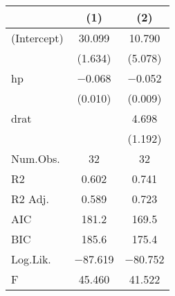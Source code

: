 \begin{table}
\centering
\begin{tabular}[t]{lcc}
\toprule
  & (1) & (2)\\
\midrule
(Intercept) & \num{30.099} & \num{10.790}\\
 & (\num{1.634}) & (\num{5.078})\\
hp & \num{-0.068} & \num{-0.052}\\
 & (\num{0.010}) & (\num{0.009})\\
drat &  & \num{4.698}\\
 &  & (\num{1.192})\\
\midrule
Num.Obs. & \num{32} & \num{32}\\
R2 & \num{0.602} & \num{0.741}\\
R2 Adj. & \num{0.589} & \num{0.723}\\
AIC & \num{181.2} & \num{169.5}\\
BIC & \num{185.6} & \num{175.4}\\
Log.Lik. & \num{-87.619} & \num{-80.752}\\
F & \num{45.460} & \num{41.522}\\
\bottomrule
\end{tabular}
\end{table}
